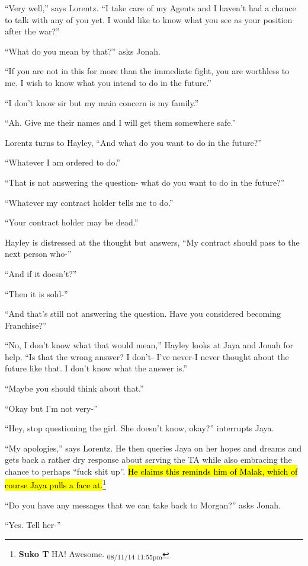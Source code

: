 ``Very well,'' says Lorentz.  ``I take care of my Agents and I haven't had a chance to talk with any of you yet.  I would like to know what you see as your position after the war?''

``What do you mean by that?'' asks Jonah.

``If you are not in this for more than the immediate fight, you are worthless to me.  I wish to know what you intend to do in the future.''

``I don't know sir but my main concern is my family.''

``Ah.  Give me their names and I will get them somewhere safe.''

Lorentz turns to Hayley, ``And what do you want to do in the future?''

``Whatever I am ordered to do.''

``That is not answering the question- what do you want to do in the future?''

``Whatever my contract holder tells me to do.''

``Your contract holder may be dead.''

Hayley is distressed at the thought but answers, ``My contract should pass to the next person who-''

``And if it doesn't?''

``Then it is sold-''

``And that's still not answering the question.  Have you considered becoming Franchise?''

``No, I don't know what that would mean,'' Hayley looks at Jaya and Jonah for help.  ``Is that the wrong answer?  I don't- I've never-I never thought about the future like that.  I don't know what the answer is.''

``Maybe you should think about that.''

``Okay but I'm not very-''

``Hey, stop questioning the girl.  She doesn't know, okay?'' interrupts Jaya.

``My apologies,'' says Lorentz.  He then queries Jaya on her hopes and dreams and gets back a rather dry response about serving the TA while also embracing the chance to perhaps ``fuck shit up''.  \hl{He claims this reminds him of Malak, which of course Jaya pulls a face at.}\footnote{\textbf{Suko T }HA!  Awesome. \textsubscript{08/11/14 11:55pm}}

``Do you have any messages that we can take back to Morgan?'' asks Jonah.

``Yes.  Tell her-''



